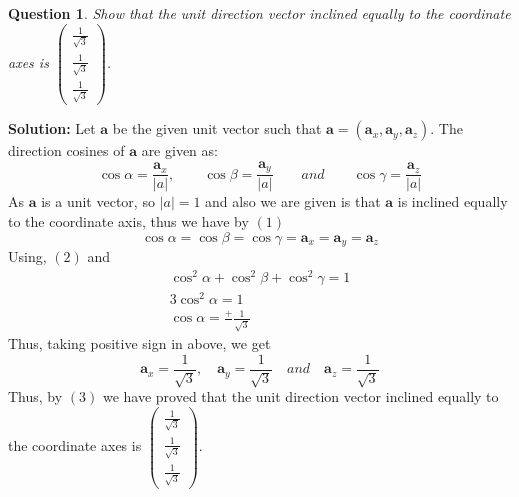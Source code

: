 \documentclass{article}
\newcommand{\solution}{\noindent \textbf{Solution: }}
\newtheorem{question}[theorem]{Question}
\newcommand{\myvec}[1]{\ensuremath{\begin{pmatrix}#1\end{pmatrix}}}
\let\vec\mathbf
\begin{document}
\begin{question}
	Show that the unit direction vector inclined equally to the coordinate axes is $\myvec{\frac{1}{\sqrt{3}} \\ \frac{1}{\sqrt{3}} \\ \frac{1}{\sqrt{3}}}$.
\end{question}
\solution Let $\vec{a}$ be the given unit vector such that $\vec{a} = (\vec{a}_x, \vec{a}_y, \vec{a}_z)$. The direction cosines of $\vec{a}$ are given as:
\begin{equation}
	\cos \alpha = \frac{\vec a_x}{|a|}, \qquad \cos \beta = \frac{\vec a_y}{|a|} \qquad and \qquad \cos \gamma = \frac{\vec a_z}{|a|}
\end{equation}	
As $\vec{a}$ is a unit vector, so $|a|=1$ and also we are given is that $\vec{a}$ is inclined equally to the coordinate axis, thus we have by $(1)$
\begin{equation}
\cos \alpha = \cos \beta =\cos \gamma = \vec a_x = \vec a_y = \vec a_z	
\end{equation}
Using, $(2)$ and
\begin{align*}
\cos^2 \alpha + \cos^2 \beta + \cos^2 \gamma = 1 \\
3\cos^2 \alpha = 1 \\
\cos \alpha = \frac{+}{} \frac{1}{\sqrt{3}}
\end{align*}
Thus, taking positive sign in above, we get	
\begin{equation}
\vec a_x = \frac{1}{\sqrt{3}}, \quad \vec a_y = \frac{1}{\sqrt{3}}  \quad and \quad \vec a_z =\frac{1}{\sqrt{3}}
\end{equation}
Thus, by $(3)$ we have proved that the unit direction vector inclined equally to the coordinate axes is $\myvec{\frac{1}{\sqrt{3}} \\ \frac{1}{\sqrt{3}} \\ \frac{1}{\sqrt{3}}}$. \\
\end{document}
